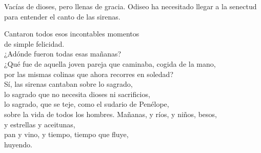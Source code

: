 Vacías de dioses, pero llenas de gracia. Odiseo ha necesitado llegar a la senectud para entender el canto de las sirenas.

\begin{versopropio}
Cantaron todos esos incontables momentos\\
de simple felicidad.\\
¿Adónde fueron todas esas mañanas?\\
¿Qué fue de aquella joven pareja que caminaba, cogida de la mano,\\
por las mismas colinas que ahora recorres en soledad?\\
Sí, las sirenas cantaban sobre lo sagrado,\\
lo sagrado que no necesita dioses ni sacrificios,\\
lo sagrado, que se teje, como el sudario de Penélope,\\
sobre la vida de todos los hombres. Mañanas, y ríos, y niños, besos,\\
y estrellas y aceitunas,\\
pan y vino, y tiempo, tiempo que fluye,\\
huyendo.
\end{versopropio}
